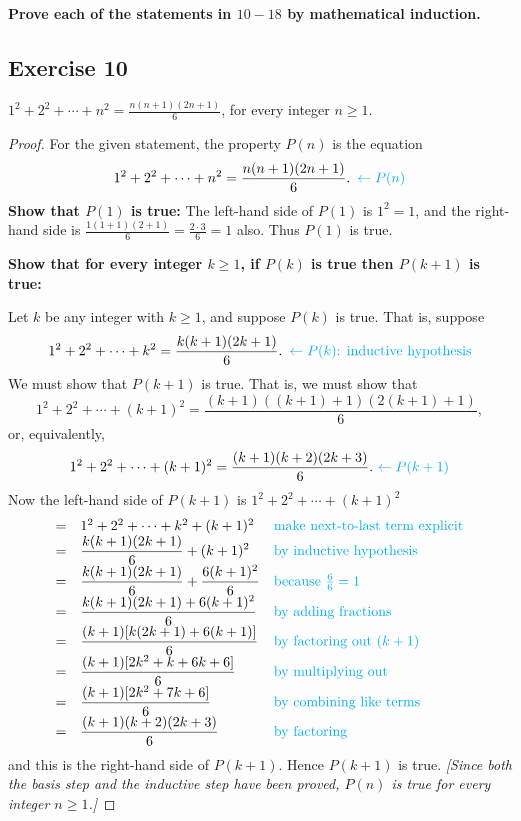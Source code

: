 \documentclass[14pt]{extarticle}
\newcommand{\dps}{\displaystyle}
\newcommand{\from}{\leftarrow}
\newcommand{\cy}{\color{cyan}}
\begin{document}
{\bf\cy Prove each of the statements in $10-18$ by mathematical induction.}

\subsection{Exercise 10}
$\dps 1^2 + 2^2 + \cdots + n^2 = \frac{n(n+1)(2n+1)}{6}$, for every integer $n \geq 1$.

\begin{proof}
For the given statement, the property $P(n)$ is the equation
\[
1^2 + 2^2 + \cdots + n^2 = \frac{n(n+1)(2n+1)}{6}. \,\,\, {\cy \from P(n)}
\]
{\bf Show that $P(1)$ is true:} The left-hand side of $P(1)$ is $1^2 = 1$, and the right-hand side is $\dps \frac{1(1+1)(2+1)}{6} = \frac{2 \cdot 3}{6} = 1$ also. Thus $P(1)$ is true.

{\bf Show that for every integer $k \geq 1$, if $P(k)$ is true then $P(k + 1)$ is true:}

Let $k$ be any integer with $k \geq 1$, and suppose $P(k)$ is true. That is, suppose
\[
1^2 + 2^2 + \cdots + k^2 = \frac{k(k+1)(2k+1)}{6}. \,\,\, {\cy \from P(k) \text{: inductive hypothesis}}
\]
We must show that $P(k + 1)$ is true. That is, we must show that
\[
1^2 + 2^2 + \cdots + (k+1)^2 = \frac{(k+1)((k+1)+1)(2(k+1)+1)}{6},
\]
or, equivalently,
\[
1^2 + 2^2 + \cdots + (k+1)^2 = \frac{(k+1)(k+2)(2k+3)}{6}. \,\,{\cy \from P(k+1)}
\]
Now the left-hand side of $P(k + 1)$ is $1^2 + 2^2 + \cdots + (k+1)^2$
\[
\begin{array}{lll}
= & 1^2 + 2^2 + \cdots + k^2 + (k+1)^2 & \text{\cy make next-to-last term explicit} \\
= & \dps \frac{k(k+1)(2k+1)}{6} + (k+1)^2 & \text{\cy by inductive hypothesis} \\
= & \dps \frac{k(k+1)(2k+1)}{6} + \frac{6(k+1)^2}{6} & \text{\cy because $\frac{6}{6} = 1$} \\
= & \dps \frac{k(k+1)(2k+1) + 6(k+1)^2}{6} & \text{\cy by adding fractions} \\
= & \dps \frac{(k+1)[k(2k+1) + 6(k+1)]}{6} & \text{\cy by factoring out $(k+1)$} \\
= & \dps \frac{(k+1)[2k^2+k + 6k+6]}{6} & \text{\cy by multiplying out} \\
= & \dps \frac{(k+1)[2k^2+7k+6]}{6} & \text{\cy by combining like terms} \\
= & \dps \frac{(k+1)(k+2)(2k+3)}{6} & \text{\cy by factoring} \\
\end{array}
\]
and this is the right-hand side of $P(k + 1)$. Hence $P(k + 1)$ is true. {\it [Since both the basis step and the inductive step have been proved, $P(n)$ is true for every integer $n \geq 1$.]}
\end{proof}
\end{document}
